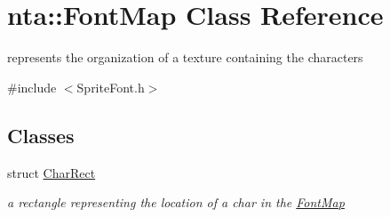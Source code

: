 \hypertarget{classnta_1_1FontMap}{}\section{nta\+:\+:Font\+Map Class Reference}
\label{classnta_1_1FontMap}


represents the organization of a texture containing the characters  




{\ttfamily \#include $<$Sprite\+Font.\+h$>$}

\subsection*{Classes}
\begin{DoxyCompactItemize}
\item 
struct \hyperlink{structnta_1_1FontMap_1_1CharRect}{Char\+Rect}
\begin{DoxyCompactList}\small\item\em a rectangle representing the location of a char in the \hyperlink{classnta_1_1FontMap}{Font\+Map} \end{DoxyCompactList}\end{DoxyCompactItemize}
